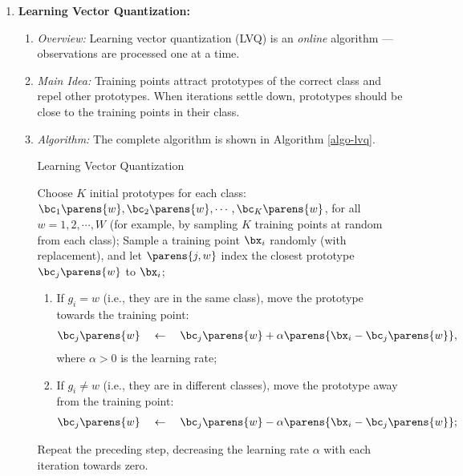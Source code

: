 \documentclass[12pt]{article}
\begin{document}
\begin{enumerate}[label=\textbf{\arabic*.}]
	\item \textbf{Learning Vector Quantization:} 
	\begin{enumerate}
		\item \textit{Overview:} Learning vector quantization (LVQ) is an \textit{online} algorithm --- observations are processed one at a time. 
		\item \textit{Main Idea:} Training points attract prototypes of the correct class and repel other prototypes. When iterations settle down, prototypes should be close to the training points in their class. 
		\item \textit{Algorithm:} The complete algorithm is shown in Algorithm \ref{algo-lvq}. 
		
		\begin{minipage}{\linewidth}
			\begin{algorithm}[H]
				\caption{Learning Vector Quantization}\label{algo-lvq}
				\begin{algorithmic}[1]
					\STATE Choose $K$ initial prototypes for each class: $\bc_1 \parens{w}, \bc_2 \parens{w}, \cdots, \bc_K \parens{w}$, for all $w = 1, 2, \cdots, W$ (for example, by sampling $K$ training points at random from each class); 
					\STATE Sample a training point $\bx_i$ randomly (with replacement), and let $\parens{j, w}$ index the closest prototype $\bc_j \parens{w}$ to $\bx_i$; 
					\begin{enumerate}
						\item If $g_i = w$ (i.e., they are in the same class), move the prototype towards the training point: 
						\begin{align*}
							\bc_j \parens{w} \quad \leftarrow \quad \bc_j \parens{w} + \alpha \parens{\bx_i - \bc_j \parens{w}}, 
						\end{align*}
						where $\alpha > 0$ is the learning rate; 
						\item If $g_i \neq w$ (i.e., they are in different classes), move the prototype away from the training point: 
						\begin{align*}
							\bc_j \parens{w} \quad \leftarrow \quad \bc_j \parens{w} - \alpha \parens{\bx_i - \bc_j \parens{w}}; 
						\end{align*}
					\end{enumerate}
					\STATE Repeat the preceding step, decreasing the learning rate $\alpha$ with each iteration towards zero. 
				\end{algorithmic}
			\end{algorithm}
		\end{minipage}
		

\end{enumerate}
\end{enumerate}
\end{document}
